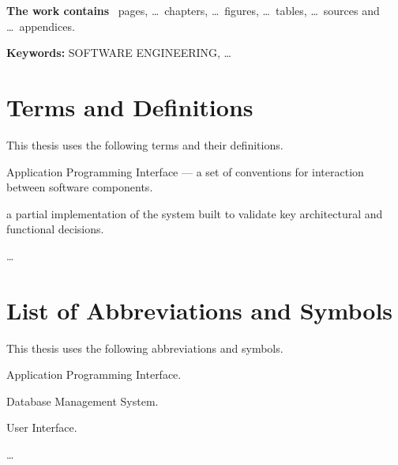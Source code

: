 \documentclass[12pt,a4paper]{extreport}
\begin{document}
\medskip
\textbf{The work contains} \pageref{LastPage}~pages, \ldots~chapters,
\ldots~figures, \ldots~tables, \ldots~sources and \ldots~appendices.

\medskip
\textbf{Keywords:} SOFTWARE ENGINEERING, \ldots

\clearpage

\tableofcontents
\clearpage


\chapter*{Terms and Definitions}
This thesis uses the following terms and their definitions.

\begin{description}[leftmargin=0pt, labelindent=0pt, font=\bfseries, style=nextline]
  \item[API] Application Programming Interface --- a set of conventions for
    interaction between software components.
  \item[Prototype] a partial implementation of the system built to validate
    key architectural and functional decisions.
  \item[\ldots] \ldots\ %
\end{description}

\clearpage

\chapter*{List of Abbreviations and Symbols}
This thesis uses the following abbreviations and symbols.

\begin{description}[leftmargin=0pt, labelindent=0pt, font=\bfseries, style=nextline]
  \item[API] Application Programming Interface.
  \item[DBMS] Database Management System.
  \item[UI] User Interface.
  \item[\ldots] \ldots\ %
\end{description}
\end{document}
